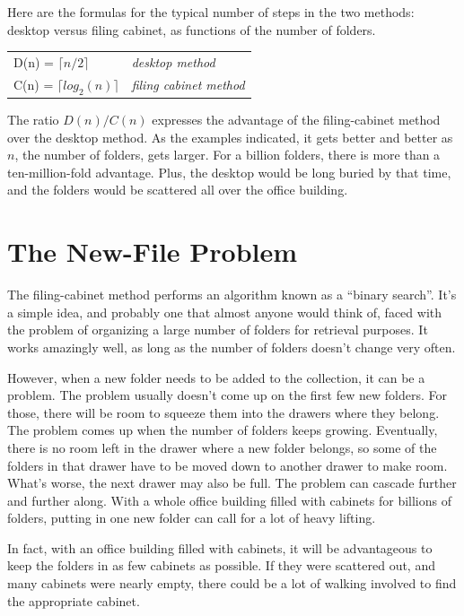 Here are the formulas for the typical number of steps in the two
methods: desktop versus filing cabinet, as functions of the number
of folders.

\begin{tabular}{ll}
D(n) = $\lceil n/2 \rceil$      & \emph{desktop method} \\
C(n) = $\lceil log_2(n) \rceil$ & \emph{filing cabinet method} \\
\end{tabular}

The ratio $D(n)/C(n)$ expresses the advantage of the filing-cabinet
method over the desktop method. As the examples indicated, it gets
better and better as $n$, the number of folders, gets larger. For a
billion folders, there is more than a ten-million-fold advantage.
Plus, the desktop would be long buried by that time,
and the folders would be scattered all over the office building.

\section{The New-File Problem}

\label{binary-search}
The filing-cabinet method performs an algorithm known as a
``binary search''.
It's a simple idea, and
probably one that almost anyone would think of, faced with the
problem of organizing a large number of folders for retrieval
purposes. It works amazingly well, as long as the number
of folders doesn't change very often.

However, when a new folder needs to be added to the
collection, it can be a problem. The problem usually doesn't come up
on the first few new folders. For those, there will be room to
squeeze them into the drawers where they belong. The problem comes
up when the number of folders keeps growing. Eventually, there is no
room left in the drawer where a new folder belongs, so some of the
folders in that drawer have to be moved down to another drawer to
make room. What's worse, the next drawer may also be full. The
problem can cascade further and further along. With a whole office
building filled with cabinets for billions of folders, putting in
one new folder can call for a lot of heavy lifting.

In fact, with an office building filled with cabinets, it will be
advantageous to keep the folders in as few cabinets as possible. If
they were scattered out, and many cabinets were nearly empty, there
could be a lot of walking involved to find the appropriate cabinet.

